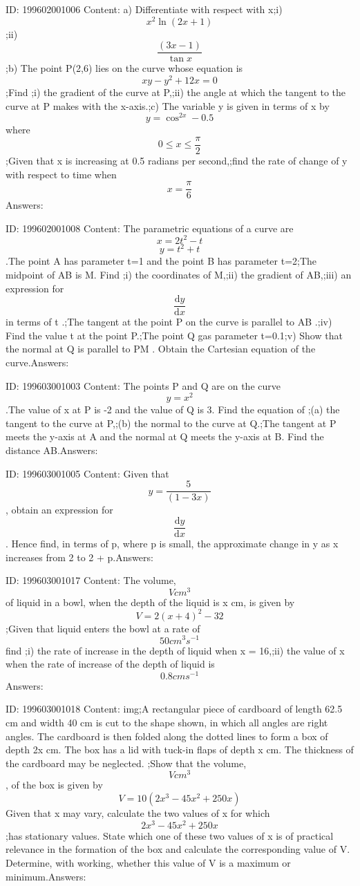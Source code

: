 \documentclass{article}
\begin{document}
ID: 199602001006
Content:
a) Differentiate with respect with x;i) \[x^2\ln(2x+1)\] ;ii) \[\frac{(3x-1)}{\tan x}\] ;b) The point P(2,6) lies on the curve whose equation is \[xy-y^2+12x=0\];Find ;i) the gradient of the curve at P,;ii) the angle at which the tangent to the curve at P makes with the x-axis.;c) The variable y is given in terms of x by \[y=\cos^{2x}-0.5\] where \[0\leq x\leq \frac{\pi }{2}\];Given that x is increasing at 0.5 radians per second,;find the rate of change of y with respect to time when \[x=\frac{\pi }{6}\]Answers:

ID: 199602001008
Content:
The parametric equations of a curve are \[x=2t^2-t\] \[y=t^2+t\].The point A has parameter t=1 and the point B has parameter t=2;The midpoint of AB is M. Find ;i) the coordinates of M,;ii) the gradient of AB,;iii) an expression for \[\frac{\mathrm{d} y}{\mathrm{d} x}\] in terms of t .;The tangent at the point P on the curve is parallel to AB .;iv) Find the value t at the point P.;The point Q gas parameter t=0.1;v) Show that the normal at Q is parallel to PM . Obtain the Cartesian equation of the curve.Answers:

ID: 199603001003
Content:
The points P and Q are on the curve \[y=x^2\].The value of x at P is -2 and the value of Q is 3. Find the equation of ;(a) the tangent to the curve at P,;(b) the normal to the curve at Q.;The tangent at P meets the y-axis at A and the normal at Q meets the y-axis at B. Find the distance AB.Answers:

ID: 199603001005
Content:
Given that \[y=\frac{5}{(1-3x)}\], obtain an expression for \[\frac{\mathrm{d} y}{\mathrm{d} x}\]. Hence find, in terms of p, where p is small, the approximate change in y as x increases from 2 to 2 + p.Answers:

ID: 199603001017
Content:
The volume, \[Vcm^3\] of liquid in a bowl, when the depth of the liquid is x cm, is given by \[V=2(x+4)^2-32\];Given that liquid enters the bowl at a rate of \[50cm^3s^{-1}\] find ;i) the rate of increase in the depth of liquid when x = 16,;ii) the value of x when the rate of increase of the depth of liquid is \[0.8cms^{-1}\]Answers:

ID: 199603001018
Content:
img;A rectangular piece of cardboard of length 62.5 cm and width 40 cm is cut to the shape shown, in which all angles are right angles. The cardboard is then folded along the dotted lines to form a box of depth 2x cm. The box has a lid with tuck-in flaps of depth x cm. The thickness of the cardboard may be neglected. ;Show that the volume, \[Vcm^3\], of the box is given by \[V = 10(2x^3-45x^2+250x)\] Given that x may vary, calculate the two values of x for which \[2x^3-45x^2+250x\];has stationary values. State which one of these two values of x is of practical relevance in the formation of the box and calculate the corresponding value of V. Determine, with working, whether this value of V is a maximum or minimum.Answers:
\end{document}
